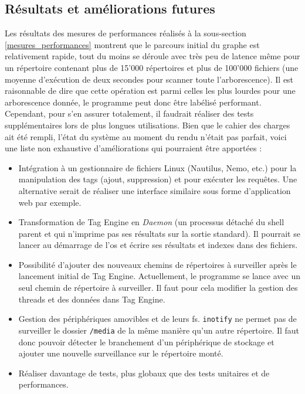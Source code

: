 \subsection{Résultats et améliorations futures}
Les résultats des mesures de performances réalisés à la sous-section \ref{mesures_performances} 
montrent que le parcours initial du graphe est relativement rapide, tout du moins se déroule 
avec très peu de latence même pour un répertoire contenant plus de 15'000 répertoires et plus de 
100'000 fichiers (une moyenne d'exécution de deux secondes pour scanner toute l'arborescence). Il 
est raisonnable de dire que cette opération est parmi celles les plus lourdes pour une arborescence 
donnée, le programme peut donc être labélisé performant. Cependant, pour s'en assurer totalement, 
il faudrait réaliser des tests supplémentaires lors de plus longues utilisations.
\bigbreak
Bien que le cahier des charges ait été rempli, l'état du système au moment du rendu n'était pas parfait, 
voici une liste non exhaustive d'améliorations qui pourraient être apportées :
\begin{itemize}
    \item Intégration à un gestionnaire de fichiers Linux (Nautilus, Nemo, etc.) pour la manipulation
        des tags (ajout, suppression) et pour exécuter les requêtes. Une alternative serait de réaliser 
        une interface similaire sous forme d'application web par exemple.
    \item Transformation de Tag Engine en \textit{Daemon} (un processus détaché du shell parent et 
        qui n'imprime pas ses résultats sur la sortie standard). Il pourrait se lancer au démarrage 
        de l'\acrshort{os} et écrire ses résultats et indexes dans des fichiers.
    \item Possibilité d'ajouter des nouveaux chemins de répertoires à surveiller après le lancement 
        initial de Tag Engine. Actuellement, le programme se lance avec un seul chemin de répertoire
        à surveiller. Il faut pour cela modifier la gestion des threads et des données dans Tag 
        Engine.
    \item Gestion des périphériques amovibles et de leurs \acrshort{fs}. \texttt{inotify} ne 
        permet pas de surveiller le dossier \texttt{/media} de la même manière qu'un 
        autre répertoire. Il faut donc pouvoir détecter le branchement d'un périphérique de stockage 
        et ajouter une nouvelle surveillance sur le répertoire monté.
    \item Réaliser davantage de tests, plus globaux que des tests unitaires et de performances.
\end{itemize}
